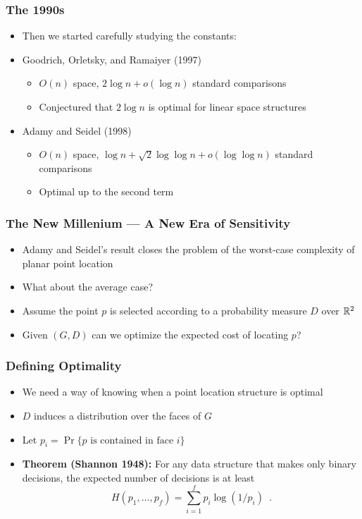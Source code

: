 \documentclass{beamer}
\begin{document}
\frame
{
  \frametitle{The 1990s}
  \begin{itemize}
  \item<1-> Then we started carefully studying the constants:
   \item<2-> Goodrich, Orletsky, and Ramaiyer (1997)
   \begin{itemize}
      \item<3-> $O(n)$ space, $2\log n + o(\log n)$ standard comparisons
      \item<4-> Conjectured that $2\log n$ is optimal for linear space structures
   \end{itemize}
   \item<5-> Adamy and Seidel (1998)
   \begin{itemize}
      \item<6-> $O(n)$ space, $\log n + \sqrt{2}\log\log n +
o(\log\log n)$ standard comparisons
      \item<7-> Optimal up to the second term
   \end{itemize}
  \end{itemize}
}

\frame
{
  \frametitle{The New Millenium --- A New Era of Sensitivity}
  \begin{itemize}
  \item<1-> Adamy and Seidel's result closes the problem of the
	worst-case complexity of planar point location
  \item<2-> What about the average case?
  \item<3-> Assume the point $p$ is selected according to a
	probability measure $D$ over $\mathbb{R}^2$
  \item<4-> Given $(G,D)$ can we optimize the expected cost of
	locating $p$?
  \end{itemize}
}

\frame
{
  \frametitle{Defining Optimality}
  \begin{itemize}
   \item<1-> We need a way of knowing when a point location structure
	is optimal
   \item<2-> $D$ induces a distribution over the faces of $G$
   \item<3-> Let $p_i=\Pr\{\mbox{$p$ is contained in face $i$}\}$
   \item<4-> \textbf{Theorem (Shannon 1948):}
     For any data structure that makes only binary decisions, the
expected number of decisions is at least
   \[
      H(p_1,\ldots,p_f) = \sum_{i=1}^f p_i\log(1/p_i)  \enspace .
   \]
  \end{itemize}
}
\end{document}
